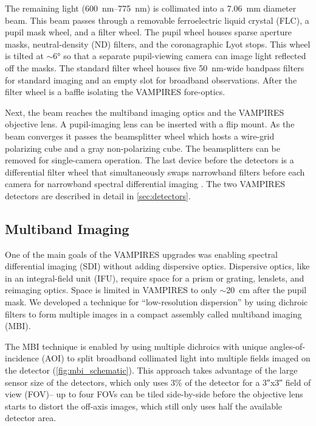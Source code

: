 The remaining light (\SIrange{600}{775}{\nano\meter}) is collimated into a \SI{7.06}{\milli\meter} diameter beam. This beam passes through a removable ferroelectric liquid crystal (FLC), a pupil mask wheel, and a filter wheel. The pupil wheel houses sparse aperture masks, neutral-density (ND) filters, and the coronagraphic Lyot stops. This wheel is tilted at $\sim$\ang{6} so that a separate pupil-viewing camera can image light reflected off the masks. The standard filter wheel houses five \SI{50}{\nano\meter}-wide bandpass filters for standard imaging and an empty slot for broadband observations. After the filter wheel is a baffle isolating the VAMPIRES fore-optics.

Next, the beam reaches the multiband imaging optics and the VAMPIRES objective lens. A pupil-imaging lens can be inserted with a flip mount. As the beam converges it passes the beamsplitter wheel which hosts a wire-grid polarizing cube and a gray non-polarizing cube. The beamsplitters can be removed for single-camera operation. The last device before the detectors is a differential filter wheel that simultaneously swaps narrowband filters before each camera for narrowband spectral differential imaging \citep{uyama_high-contrast_2020}. The two VAMPIRES detectors are described in detail in \autoref{sec:detectors}.

\subsection{Multiband Imaging} \label{sec:mbi}

One of the main goals of the VAMPIRES upgrades was enabling spectral differential imaging (SDI) without adding dispersive optics. Dispersive optics, like in an integral-field unit (IFU), require space for a prism or grating, lenslets, and reimaging optics. Space is limited in VAMPIRES to only $\sim$\SI{20}{\centi\meter} after the pupil mask. We developed a technique for ``low-resolution dispersion'' by using dichroic filters to form multiple images in a compact assembly called multiband imaging (MBI).

The MBI technique is enabled by using multiple dichroics with unique angles-of-incidence (AOI) to split broadband collimated light into multiple fields imaged on the detector (\autoref{fig:mbi_schematic}). This approach takes advantage of the large sensor size of the detectors, which only uses 3\% of the detector for a \ang{;;3}x\ang{;;3} field of view (FOV)-- up to four FOVs can be tiled side-by-side before the objective lens starts to distort the off-axis images, which still only uses half the available detector area.

